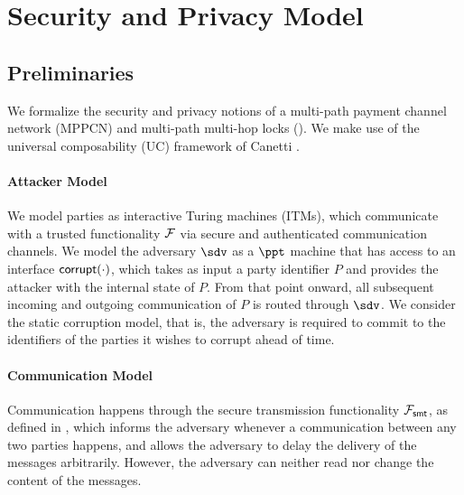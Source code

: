 \section{Security and Privacy Model}
\label{sec:security-model}

\subsection{Preliminaries}
\label{sec:model-prelims}

We formalize the security and privacy notions of a multi-path payment channel network (MPPCN) 
and multi-path multi-hop locks (\sysname). We make use of the universal composability (UC) 
framework of Canetti \cite{canetti}.

\paragraph{Attacker Model}
We model parties as interactive Turing machines (ITMs), which communicate with a trusted 
functionality $\mathcal{F}$ via secure and authenticated communication channels. We model the 
adversary $\sdv$ as a $\ppt$ machine that has access to an interface $\mathsf{corrupt}(\cdot)$, 
which takes as input a party identifier $P$ and provides the attacker with the internal 
state of $P$. From that point onward, all subsequent incoming and outgoing communication 
of $P$ is routed through $\sdv$. We consider the static corruption model, that is, the 
adversary is required to commit to the identifiers of the parties it wishes to corrupt 
ahead of time.

\paragraph{Communication Model}
Communication happens through the secure transmission functionality $\mathcal{F}_{\mathsf{smt}}$, as 
defined in \cite{canetti}, which informs the adversary whenever a communication between 
any two parties happens, and allows the adversary to delay the delivery of the messages 
arbitrarily. However, the adversary can neither read nor change the content of the messages.

